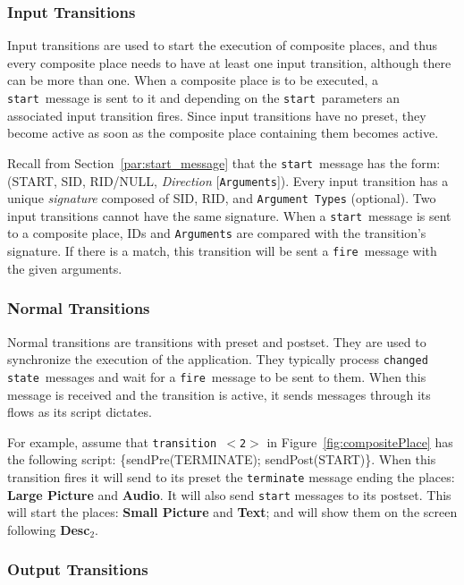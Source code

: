\documentclass[twocolumn,10pt]{article}
\newcommand{\start}{{\tt start}}
\newcommand{\fire}{{\tt fire}}
\newcommand{\changedState}{{\tt changed state}}
\newcommand{\termRep}{TERMINATE}
\newcommand{\startRep}{START}
\newcommand{\trans}[1]{{\tt transition $<$#1$>$}}
\newcommand{\event}[1]{{\tt #1}}
\newcommand{\elmt}[1]{{\bf #1}}
\begin{document}
\subsubsection*{Input Transitions}

Input transitions are used to start the execution of composite
places, and thus every composite place needs to have at least one input
transition, although there can be more than one.  When a composite place is to
be executed, a \start\ message is sent to it and depending on the
\start\ parameters an associated input transition fires.  Since input
transitions have no preset, they become active as soon as the
composite place containing them becomes active.

Recall from Section~\ref{par:start_message} that the \start\ message
has the form: (\startRep, SID, RID/NULL, {\em Direction}
[{\tt Arguments}]).
Every input transition has a unique {\em signature} composed of SID, RID, and
{\tt Argument Types} (optional).  Two input transitions cannot have
the same signature.  When a \start\ message is sent to a composite
place, IDs and {\tt Arguments} are compared with the transition's
signature.  If there is a match, this transition will be sent a \fire\
message with the given arguments.

\subsubsection*{Normal Transitions}

Normal transitions are transitions with preset and postset.  They are
used to synchronize the execution of the application.  They typically
process  \changedState\ messages and wait for a \fire\ message to
be sent to them.  When this message is received and the transition is
active, it sends messages through its flows as its script dictates.

For example, assume that \trans{2} in Figure~\ref{fig:compositePlace}
has the following script: \{sendPre(\termRep);
sendPost(\startRep)\}.  When this transition fires it will send to
its preset the \event{terminate} message ending the places:
\elmt{Large Picture} and \elmt{Audio}.  It will also send
\event{start} messages to its postset.  This will start the places:
\elmt{Small Picture} and \elmt{Text}; and will show them on the screen
following \elmt{Desc$_2$}.


\subsubsection*{Output Transitions}
\end{document}
